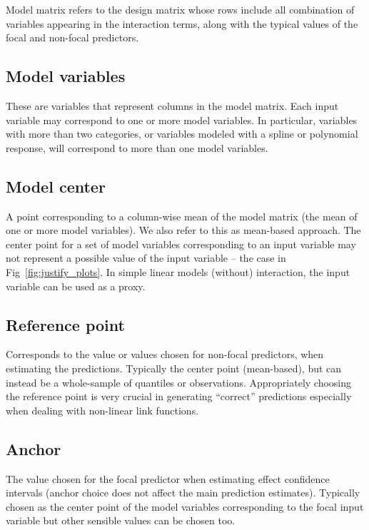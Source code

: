 Model matrix refers to the design matrix whose rows include all combination of variables appearing in the interaction terms, along with the typical values of the focal and non-focal predictors. 

\subsection{Model variables}

These are variables that represent columns in the model matrix. Each input variable may correspond to one or more model variables. In particular, variables with more than two categories, or variables modeled with a spline or polynomial response, will correspond to more than one model variables.

\subsection{Model center} 

A point corresponding to a column-wise mean of the model matrix (the mean of one or more model variables). We also refer to this as mean-based approach. The center point for a set of model variables corresponding to an input variable may not represent a possible value of the input variable -- the case in Fig~\ref{fig:justify_plots}. In simple linear models (without) interaction, the input variable can be used as a proxy.

\subsection{Reference point}

Corresponds to the value or values chosen for non-focal predictors, when estimating the predictions. Typically the center point (mean-based), but can instead be a whole-sample of quantiles or observations. Appropriately choosing the reference point is very crucial in generating ``correct'' predictions especially when dealing with non-linear link functions.


\subsection{Anchor}

The value chosen for the focal predictor when estimating effect confidence intervals (anchor choice does not affect the main prediction estimates). Typically chosen as the center point of the model variables corresponding to the focal input variable but other sensible values can be chosen too.

